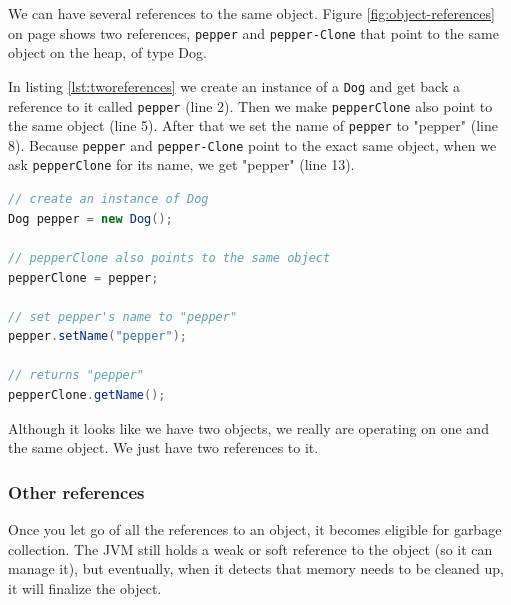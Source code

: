 We can have several references to the same object. Figure \ref{fig:object-references} on page \pageref{fig:object-references} shows two references, \texttt{pepper} and \texttt{pepper\hyp{}Clone} that point to the same object on the heap, of type Dog.

In listing \ref{lst:tworeferences} we create an instance of a \texttt{Dog} and get back a reference to it called \texttt{pepper} (line 2). Then we make \texttt{pepperClone} also point to the same object (line 5). After that we set the name of \texttt{pepper} to "pepper" (line 8). Because \texttt{pepper} and \texttt{pepper\hyp{}Clone} point to the exact same object, when we ask \texttt{pepperClone} for its name, we get "pepper" (line 13). 

\begin{lstlisting}[language=Java, caption=Multiple References to an Object, label=lst:tworeferences]
// create an instance of Dog
Dog pepper = new Dog();

// pepperClone also points to the same object
pepperClone = pepper;

// set pepper's name to "pepper"
pepper.setName("pepper");

// returns "pepper"
pepperClone.getName();

\end{lstlisting}
\vspace{2em}

Although it looks like we have two objects, we really are operating on one and the same object. We just have two references to it.

\subsubsection{Other references}
Once you let go of all the references to an object, it becomes eligible for garbage collection. The JVM still holds a weak or soft reference to the object (so it can manage it), but eventually, when it detects that memory needs to be cleaned up, it will finalize the object.\cite{reference}

